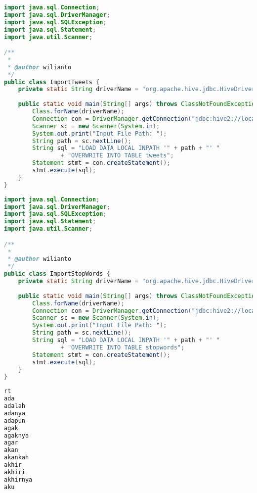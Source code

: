 \begin{lstlisting}[language=Java,basicstyle=\tiny,caption=ImportTweets.java]
import java.sql.Connection;
import java.sql.DriverManager;
import java.sql.SQLException;
import java.sql.Statement;
import java.util.Scanner;

/**
 *
 * @author wilianto
 */
public class ImportTweets {
    private static String driverName = "org.apache.hive.jdbc.HiveDriver";
    
    public static void main(String[] args) throws ClassNotFoundException, SQLException {
        Class.forName(driverName);
        Connection con = DriverManager.getConnection("jdbc:hive2://localhost:10000/default", "wilianto", "");
        Scanner sc = new Scanner(System.in);
        System.out.print("Input File Path: ");
        String path = sc.nextLine();
        String sql = "LOAD DATA LOCAL INPATH '" + path + "' "
                + "OVERWRITE INTO TABLE tweets";
        Statement stmt = con.createStatement();
        stmt.execute(sql);
    }
}
\end{lstlisting}

\begin{lstlisting}[language=Java,basicstyle=\tiny,caption=ImportStopWords.java]
import java.sql.Connection;
import java.sql.DriverManager;
import java.sql.SQLException;
import java.sql.Statement;
import java.util.Scanner;

/**
 *
 * @author wilianto
 */
public class ImportStopWords {
    private static String driverName = "org.apache.hive.jdbc.HiveDriver";
    
    public static void main(String[] args) throws ClassNotFoundException, SQLException {
        Class.forName(driverName);
        Connection con = DriverManager.getConnection("jdbc:hive2://localhost:10000/default", "wilianto", "");
        Scanner sc = new Scanner(System.in);
        System.out.print("Input File Path: ");
        String path = sc.nextLine();
        String sql = "LOAD DATA LOCAL INPATH '" + path + "' "
                + "OVERWRITE INTO TABLE stopwords";
        Statement stmt = con.createStatement();
        stmt.execute(sql);
    }
}
\end{lstlisting}

\begin{lstlisting}[language=Java,basicstyle=\tiny,caption=Isi file stopwords.txt]
rt
ada
adalah
adanya
adapun
agak
agaknya
agar
akan
akankah
akhir
akhiri
akhirnya
aku
\end{lstlisting}

